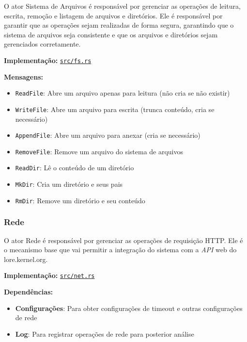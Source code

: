 O ator Sistema de Arquivos é responsável por gerenciar as operações de leitura, escrita, remoção e listagem de arquivos e diretórios. Ele é responsável por garantir que as operações sejam realizadas de forma segura, garantindo que o sistema de arquivos seja consistente e que os arquivos e diretórios sejam gerenciados corretamente.

\textbf{Implementação:} \href{https://github.com/nahharris/ph-actors-tcc/blob/master/src/fs.rs}{\texttt{src/fs.rs}}

\textbf{Mensagens:}

\begin{itemize}
    \item \texttt{ReadFile}: Abre um arquivo apenas para leitura (não cria se não existir)
    \item \texttt{WriteFile}: Abre um arquivo para escrita (trunca conteúdo, cria se necessário)
    \item \texttt{AppendFile}: Abre um arquivo para anexar (cria se necessário)
    \item \texttt{RemoveFile}: Remove um arquivo do sistema de arquivos
    \item \texttt{ReadDir}: Lê o conteúdo de um diretório
    \item \texttt{MkDir}: Cria um diretório e seus pais
    \item \texttt{RmDir}: Remove um diretório e seu conteúdo
\end{itemize}

\subsubsection{Rede}

O ator Rede é responsável por gerenciar as operações de requisição HTTP. Ele é o mecanismo base que vai permitir a integração do sistema com a \emph{API} web do lore.kernel.org.

\textbf{Implementação:} \href{https://github.com/nahharris/ph-actors-tcc/blob/master/src/net.rs}{\texttt{src/net.rs}}

\textbf{Dependências:}

\begin{itemize}
    \item \textbf{Configurações}: Para obter configurações de timeout e outras configurações de rede
    \item \textbf{Log}: Para registrar operações de rede para posterior análise
\end{itemize}

